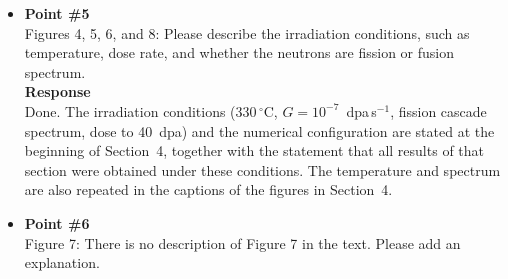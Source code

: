 \documentclass{article}
\newif\ifshowauthornotes
\newcommand{\authornote}[1]{\ifshowauthornotes{\color{red}\ [\textbf{Author action:} #1]}\fi}
\newcommand{\hkl}[1]{\langle #1\rangle}
\newcommand{\half}{\tfrac{1}{2}}
\newcommand{\imob}{i_{\rm mobile}}
\begin{document}
\begin{itemize}
\textbf{Response}\\
In the revised model the outcome depends on the reaction channel. Two $\half\hkl{111}$ clusters that coalesce by the ordinary channel produce a $\half\hkl{111}$ loop of the combined size. This product is mobile if its size does not exceed the mobility cutoff $\imob$, and it is otherwise a sessile loop that acts only as a sink. A fraction $\phi_{\rm junc}$ of the encounters between comparable $\half\hkl{111}$ loops instead follows the Marian junction reaction and produces a sessile $\hkl{100}$ loop (Eqs.~(S71)--(S75)). The junction partitions the encounter rate rather than adding to it, so no encounter is counted twice. When a small mobile $\half\hkl{111}$ cluster is absorbed by a sessile $\hkl{100}$ host, the product retains the $\hkl{100}$ character of the host and is sessile (Eqs.~(S76)--(S78)). This rule is consistent with in-situ observations that interacting loops adopt the Burgers vector of the larger partner (Arakawa et al., Phys.\ Rev.\ Lett.\ 96 (2006) 125506). These rules are stated in Section~4.2 and in Table~S5.

\item \textbf{Point \#5}\\
Figures 4, 5, 6, and 8: Please describe the irradiation conditions, such as temperature, dose rate, and whether the neutrons are fission or fusion spectrum.\\

\textbf{Response}\\
Done. The irradiation conditions ($330\,^\circ$C, $G=10^{-7}$~dpa\,s$^{-1}$, fission cascade spectrum, dose to 40~dpa) and the numerical configuration are stated at the beginning of Section~4, together with the statement that all results of that section were obtained under these conditions. The temperature and spectrum are also repeated in the captions of the figures in Section~4.

\authornote{Figures~5--8 captions in the September 17 PDF do not yet repeat temperature, dose rate and spectrum (only Figs.~3 and 4 do); add them.}

\item \textbf{Point \#6}\\
Figure 7: There is no description of Figure 7 in the text. Please add an explanation.\\


\end{itemize}
\end{document}
